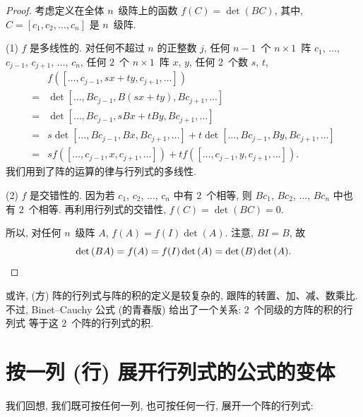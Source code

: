 \documentclass[../libro.tex]{subfiles}
\begin{document}
\begin{proof}
    考虑定义在全体 \(n\)~级阵上的函数
    \(f(C) = \det {(BC)}\),
    其中, \(C = [c_1, c_2, \dots, c_n]\) 是 \(n\)~级阵.

    (1)
    \(f\) 是多线性的.
    对任何不超过 \(n\) 的正整数 \(j\),
    任何 \(n-1\)~个 \(n \times 1\)~阵
    \(c_1\), \(\dots\), \(c_{j-1}\),
    \(c_{j+1}\), \(\dots\), \(c_n\),
    任何 \(2\)~个 \(n \times 1\)~阵 \(x\), \(y\),
    任何 \(2\)~个数 \(s\), \(t\),
    \begin{align*}
        &
        f([\dots, c_{j-1}, sx + ty, c_{j+1}, \dots])
        \\
        = {} &
        \det {[\dots, Bc_{j-1}, B(sx + ty), Bc_{j+1}, \dots]}
        \\
        = {} &
        \det {[\dots, Bc_{j-1}, sBx + tBy, Bc_{j+1}, \dots]}
        \\
        = {} &
        s\det {[\dots, Bc_{j-1}, Bx, Bc_{j+1}, \dots]}
        + t\det {[\dots, Bc_{j-1}, By, Bc_{j+1}, \dots]}
        \\
        = {} &
        s f([\dots, c_{j-1}, x, c_{j+1}, \dots])
        + t f([\dots, c_{j-1}, y, c_{j+1}, \dots]).
    \end{align*}
    我们用到了阵的运算的律与行列式的多线性.

    (2)
    \(f\) 是交错性的.
    因为若 \(c_1\), \(c_2\), \(\dots\), \(c_n\) 中有 \(2\)~个相等,
    则 \(Bc_1\), \(Bc_2\), \(\dots\), \(Bc_n\) 中也有 \(2\)~个相等.
    再利用行列式的交错性,
    \(f(C) = \det {(BC)} = 0\).

    所以, 对任何 \(n\)~级阵 \(A\),
    \(f(A) = f(I) \det {(A)}\).
    注意, \(BI = B\),
    故
    \begin{equation*}
        \det {(BA)} = f(A) = f(I) \det {(A)}
        = \det {(B)} \det {(A)}.
        \qedhere
    \end{equation*}
\end{proof}

或许, (方) 阵的行列式与阵的积的定义是较复杂的,
跟阵的转置、加、减、数乘比.
不过, Binet--Cauchy 公式 (的青春版) 给出了一个关系:
\(2\)~个同级的方阵的积的行列式%
等于这 \(2\)~个阵的行列式的积.

\section{按一列 (行) 展开行列式的公式的变体}

我们回想,
我们既可按任何一列, 也可按任何一行,
展开一个阵的行列式:
\end{document}

